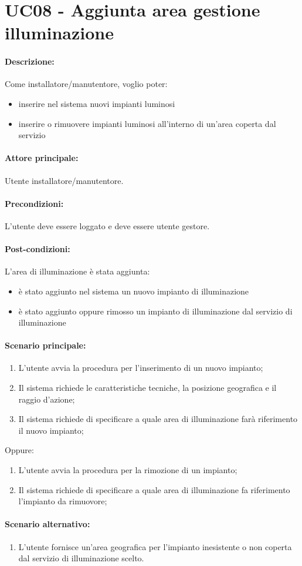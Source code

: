 \section{UC08 - Aggiunta area gestione illuminazione}

\paragraph{Descrizione:}
Come installatore/manutentore, voglio poter:
\begin{itemize}
    \item inserire nel sistema nuovi impianti luminosi
    \item inserire o rimuovere impianti luminosi all'interno di un'area coperta dal servizio
\end{itemize}


\paragraph{Attore principale:}
Utente installatore/manutentore.

\paragraph{Precondizioni:}
L'utente deve essere loggato e deve essere utente gestore.
\paragraph{Post-condizioni:}
L'area di illuminazione è stata aggiunta:
\begin{itemize}
    \item è stato aggiunto nel sistema un nuovo impianto di illuminazione 
    \item è stato aggiunto oppure rimosso un impianto di illuminazione dal servizio di illuminazione
\end{itemize}

\paragraph{Scenario principale:}
\begin{enumerate}
    \item L’utente avvia la procedura per l’inserimento di un nuovo impianto;
    \item Il sistema richiede le caratteristiche tecniche, la posizione geografica e il raggio d'azione;
    \item Il sistema richiede di specificare a quale area di illuminazione farà riferimento il nuovo impianto;
\end{enumerate}
Oppure:
\begin{enumerate}
    \item L’utente avvia la procedura per la rimozione di un impianto;
    \item Il sistema richiede di specificare a quale area di illuminazione fa riferimento l'impianto da rimuovore;
\end{enumerate}

\paragraph{Scenario alternativo:}
\begin{enumerate}
    \item L'utente fornisce un'area geografica per l'impianto inesistente o non coperta dal servizio di illuminazione scelto.
\end{enumerate}
